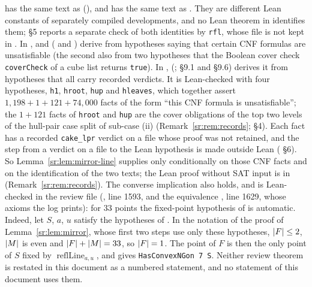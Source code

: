 \begin{remark}\label{sr:rem:mirror-line}
 has the same text as 
(), and  has the same text as . They are
different Lean constants of separately compiled developments, and no Lean theorem in  identifies them;
 \S5 reports a separate check of both identities by \texttt{rfl}, whose file is not kept in
. In ,  and
 ( and ) derive
 from hypotheses saying that certain CNF formulas are unsatisfiable (the second also from
two hypotheses that the Boolean cover check \texttt{coverCheck} of a cube list returns \texttt{true}). In ,
 (;  \S9.1 and \S9.6)
derives it from hypotheses that all carry recorded verdicts. It is Lean-checked with four hypotheses, \texttt{h1},
\texttt{hroot}, \texttt{hup} and \texttt{hleaves}, which together assert $1{,}198+1+121+74{,}000$ facts of the form
``this CNF formula is unsatisfiable''; the $1+121$ facts of \texttt{hroot} and \texttt{hup} are the cover obligations
of the top two levels of the hull-pair case split of sub-case (ii) (Remark~\ref{sr:rem:records};
 \S4). Each fact has a recorded \texttt{cake\_lpr} verdict on a file whose proof was
not retained, and the step from a verdict on a file to the Lean hypothesis is made outside Lean
( \S6). So
Lemma~\ref{sr:lem:mirror-line} supplies  only conditionally on those CNF facts and on the
identification of the two texts; the Lean proof without SAT input is in 
(Remark~\ref{sr:rem:records}). The converse implication also holds, and is Lean-checked in the review file
 (, line 1593, and the
equivalence , line 1629, whose axioms the log
 prints): for $33$ points the fixed-point hypothesis of  is
automatic. Indeed, let $S$, $a$, $u$ satisfy the hypotheses of . In the notation of the
proof of Lemma~\ref{sr:lem:mirror}, whose first two steps use only these hypotheses, $\lvert F\rvert\le2$, $\lvert M\rvert$ is even
and $\lvert F\rvert+\lvert M\rvert=33$, so $\lvert F\rvert=1$. The point of $F$ is then the only point of $S$ fixed by
$\operatorname{reflLine}_{a,u}$, and  gives \texttt{HasConvexNGon 7 S}. Neither review theorem
is restated in this document as a numbered statement, and no statement of this document uses them.
\end{remark}

